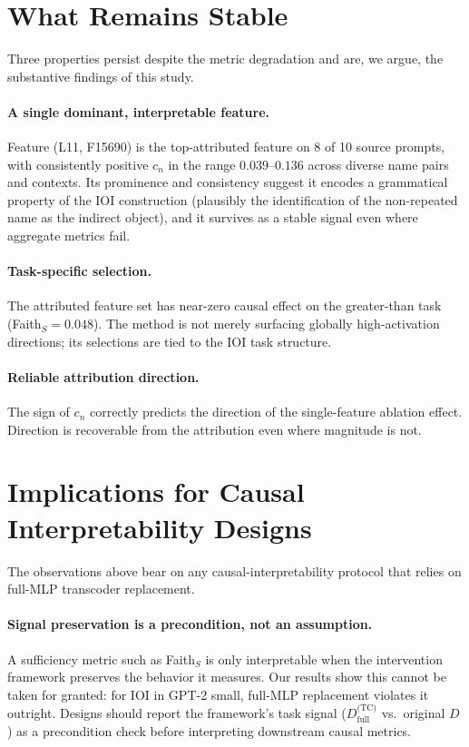 \documentclass{article}
\begin{document}
\section{What Remains Stable}

Three properties persist despite the metric degradation and are, we argue, the
substantive findings of this study.

\paragraph{A single dominant, interpretable feature.}
Feature (L11, F15690) is the top-attributed feature on 8 of 10 source prompts,
with consistently positive $c_n$ in the range $0.039$--$0.136$ across diverse
name pairs and contexts. Its prominence and consistency suggest it encodes a
grammatical property of the IOI construction (plausibly the identification of
the non-repeated name as the indirect object), and it survives as a stable
signal even where aggregate metrics fail.

\paragraph{Task-specific selection.}
The attributed feature set has near-zero causal effect on the greater-than task
(Faith$_S = 0.048$). The method is not merely surfacing globally high-activation
directions; its selections are tied to the IOI task structure.

\paragraph{Reliable attribution direction.}
The sign of $c_n$ correctly predicts the direction of the single-feature
ablation effect. Direction is recoverable from the attribution even where
magnitude is not.

\section{Implications for Causal Interpretability Designs}

The observations above bear on any causal-interpretability protocol that relies
on full-MLP transcoder replacement.

\paragraph{Signal preservation is a precondition, not an assumption.}
A sufficiency metric such as Faith$_S$ is only interpretable when the
intervention framework preserves the behavior it measures. Our results show this
cannot be taken for granted: for IOI in GPT-2 small, full-MLP replacement
violates it outright. Designs should report the framework's task signal
($D_\text{full}^\text{(TC)}$ vs.\ original $D$) as a precondition check before
interpreting downstream causal metrics.
\end{document}
